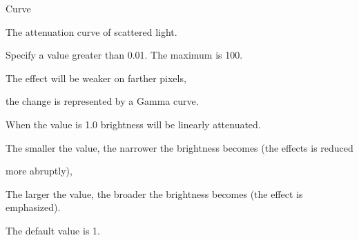 \documentclass[a4paper,12pt]{article}
\begin{document}
Curve\par
The attenuation curve of scattered light.\par
Specify a value greater than 0.01. The maximum is 100.\par
The effect will be weaker on farther pixels,\par
the change is represented by a Gamma curve.\par
When the value is 1.0 brightness will be linearly attenuated.\par
The smaller the value, the narrower the brightness becomes (the effects is reduced\par 
more abruptly),\par
The larger the value, the broader the brightness becomes (the effect is emphasized).\par
The default value is 1.

\newpage

\thispagestyle{empty}
\end{document}
